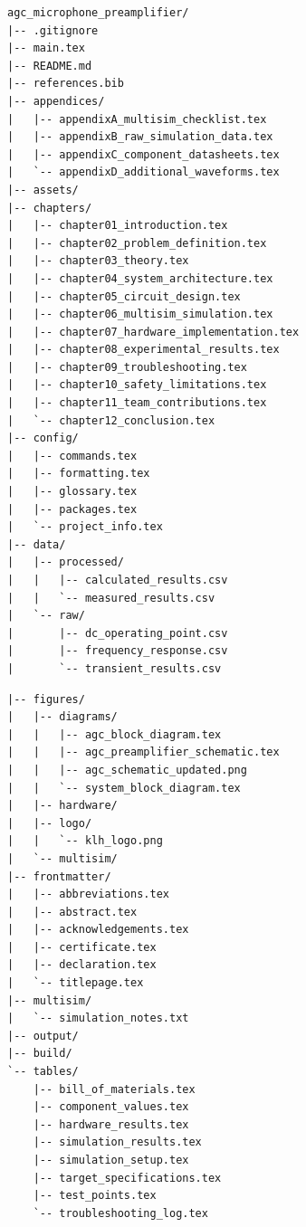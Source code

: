 \documentclass[12pt,a4paper]{report}
\begin{document}
\noindent
\begin{minipage}[t]{0.485\textwidth}
\begin{lstlisting}[style=treestyle]
agc_microphone_preamplifier/
|-- .gitignore
|-- main.tex
|-- README.md
|-- references.bib
|-- appendices/
|   |-- appendixA_multisim_checklist.tex
|   |-- appendixB_raw_simulation_data.tex
|   |-- appendixC_component_datasheets.tex
|   `-- appendixD_additional_waveforms.tex
|-- assets/
|-- chapters/
|   |-- chapter01_introduction.tex
|   |-- chapter02_problem_definition.tex
|   |-- chapter03_theory.tex
|   |-- chapter04_system_architecture.tex
|   |-- chapter05_circuit_design.tex
|   |-- chapter06_multisim_simulation.tex
|   |-- chapter07_hardware_implementation.tex
|   |-- chapter08_experimental_results.tex
|   |-- chapter09_troubleshooting.tex
|   |-- chapter10_safety_limitations.tex
|   |-- chapter11_team_contributions.tex
|   `-- chapter12_conclusion.tex
|-- config/
|   |-- commands.tex
|   |-- formatting.tex
|   |-- glossary.tex
|   |-- packages.tex
|   `-- project_info.tex
|-- data/
|   |-- processed/
|   |   |-- calculated_results.csv
|   |   `-- measured_results.csv
|   `-- raw/
|       |-- dc_operating_point.csv
|       |-- frequency_response.csv
|       `-- transient_results.csv
\end{lstlisting}
\end{minipage}\hfill
\begin{minipage}[t]{0.485\textwidth}
\begin{lstlisting}[style=treestyle]
|-- figures/
|   |-- diagrams/
|   |   |-- agc_block_diagram.tex
|   |   |-- agc_preamplifier_schematic.tex
|   |   |-- agc_schematic_updated.png
|   |   `-- system_block_diagram.tex
|   |-- hardware/
|   |-- logo/
|   |   `-- klh_logo.png
|   `-- multisim/
|-- frontmatter/
|   |-- abbreviations.tex
|   |-- abstract.tex
|   |-- acknowledgements.tex
|   |-- certificate.tex
|   |-- declaration.tex
|   `-- titlepage.tex
|-- multisim/
|   `-- simulation_notes.txt
|-- output/
|-- build/
`-- tables/
    |-- bill_of_materials.tex
    |-- component_values.tex
    |-- hardware_results.tex
    |-- simulation_results.tex
    |-- simulation_setup.tex
    |-- target_specifications.tex
    |-- test_points.tex
    `-- troubleshooting_log.tex
\end{lstlisting}
\end{minipage}
\end{document}
